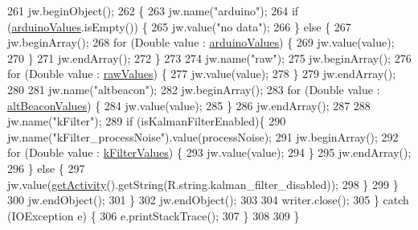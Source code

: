 \begin{DoxyCode}
261                 jw.beginObject();
262                 \{
263                     jw.name(\textcolor{stringliteral}{"arduino"});
264                     \textcolor{keywordflow}{if} (\hyperlink{classit_1_1unibo_1_1torsello_1_1bluetoothpositioning_1_1util_1_1ReportUtils_a3557dcc1662461b46fcd4d18eee9780e_a3557dcc1662461b46fcd4d18eee9780e}{arduinoValues}.isEmpty()) \{
265                         jw.value(\textcolor{stringliteral}{"no data"});
266                     \} \textcolor{keywordflow}{else} \{
267                         jw.beginArray();
268                         \textcolor{keywordflow}{for} (Double value : \hyperlink{classit_1_1unibo_1_1torsello_1_1bluetoothpositioning_1_1util_1_1ReportUtils_a3557dcc1662461b46fcd4d18eee9780e_a3557dcc1662461b46fcd4d18eee9780e}{arduinoValues}) \{
269                             jw.value(value);
270                         \}
271                         jw.endArray();
272                     \}
273 
274                     jw.name(\textcolor{stringliteral}{"raw"});
275                     jw.beginArray();
276                     \textcolor{keywordflow}{for} (Double value : \hyperlink{classit_1_1unibo_1_1torsello_1_1bluetoothpositioning_1_1util_1_1ReportUtils_adbe56bea0813a48932ef94b8b27c3314_adbe56bea0813a48932ef94b8b27c3314}{rawValues}) \{
277                         jw.value(value);
278                     \}
279                     jw.endArray();
280 
281                     jw.name(\textcolor{stringliteral}{"altbeacon"});
282                     jw.beginArray();
283                     \textcolor{keywordflow}{for} (Double value : \hyperlink{classit_1_1unibo_1_1torsello_1_1bluetoothpositioning_1_1util_1_1ReportUtils_a6e72cc0d840390d44e6cbccece68e240_a6e72cc0d840390d44e6cbccece68e240}{altBeaconValues}) \{
284                         jw.value(value);
285                     \}
286                     jw.endArray();
287 
288                     jw.name(\textcolor{stringliteral}{"kFilter"});
289                     \textcolor{keywordflow}{if} (isKalmanFilterEnabled)\{
290                         jw.name(\textcolor{stringliteral}{"kFilter\_processNoise"}).value(processNoise);
291                         jw.beginArray();
292                         \textcolor{keywordflow}{for} (Double value : \hyperlink{classit_1_1unibo_1_1torsello_1_1bluetoothpositioning_1_1util_1_1ReportUtils_a9a40344497c5522bbc90f03581c2713a_a9a40344497c5522bbc90f03581c2713a}{kFilterValues}) \{
293                             jw.value(value);
294                         \}
295                         jw.endArray();
296                     \} \textcolor{keywordflow}{else} \{
297                         jw.value(\hyperlink{classit_1_1unibo_1_1torsello_1_1bluetoothpositioning_1_1util_1_1ReportUtils_a397da2904c606315301d19eb39451181_a397da2904c606315301d19eb39451181}{getActivity}().getString(R.string.kalman\_filter\_disabled));
298                     \}
299                 \}
300                 jw.endObject();
301             \}
302             jw.endObject();
303 
304             writer.close();
305         \} \textcolor{keywordflow}{catch} (IOException e) \{
306             e.printStackTrace();
307         \}
308 
309     \}
\end{DoxyCode}


